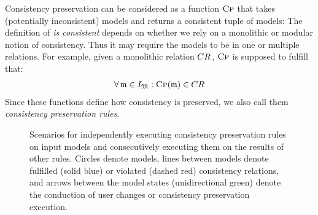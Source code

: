 Consistency preservation can be considered as a function $\textsc{Cp}$ that takes (potentially inconsistent) models and returns a consistent tuple of models:
%
The definition of \emph{is consistent} depends on whether we rely on a monolithic or modular notion of consistency.
Thus it may require the models to be in one or multiple relations.
For example, given a monolithic relation $\consistencyrelation{CR}{}$, $\textsc{Cp}$ is supposed to fulfill that: 
\begin{align*}
    \forall \modeltuple{m} \in \metamodeltupleinstanceset{M} : \function{Cp}(\modeltuple{m}) \in \consistencyrelation{CR}{}
\end{align*}
Since these functions define how consistency is preserved, we also call them \emph{consistency preservation rules}.

\begin{figure}
    \centering
    
    \caption[Execution alternatives of consistency preservation rules]{Scenarios for independently executing consistency preservation rules on input models and consecutively executing them on the results of other rules. Circles denote models, lines between models denote fulfilled (solid blue) or violated (dashed red) consistency relations, and arrows between the model states (unidirectional green) denote the conduction of user changes or consistency preservation execution.}
    \label{fig:correctness:concurrent_consecutive_execution}
\end{figure}

